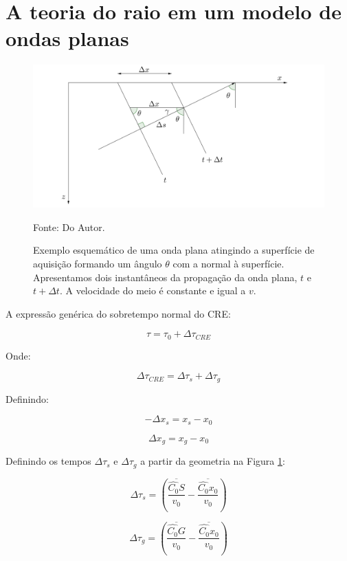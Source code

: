 \documentclass[a4paper, 12pt]{article}
\begin{document}
\section{A teoria do raio em um modelo de ondas planas}

\begin{figure}[H]
\caption{Exemplo esquemático de uma onda plana atingindo a superfície de aquisição formando um ângulo $\theta$
com a normal à superfície. Apresentamos dois instantâneos da propagação da onda plana, $t$ e $t + \Delta t$.
A velocidade do meio é constante e igual a $v$.}
\begin{center}
\includegraphics[scale=0.7]{images/raio_ondas_planas.png}
\vspace{-0.3cm}
\end{center}
\begin{center}
 Fonte: Do Autor.
\end{center}
\label{fig:1.1}
\end{figure}

A expressão genérica do sobretempo normal do CRE:

\begin{equation}
\label{eq:1.1}
\tau = \tau_0 + \Delta \tau_{CRE}
\end{equation}

Onde:

\begin{equation}
\label{eq:1.2}
\Delta \tau_{CRE} = \Delta \tau_s + \Delta \tau_g
\end{equation}

Definindo:

\begin{equation}
\label{eq:1.3}
-\Delta x_s = x_s - x_0
\end{equation}

\begin{equation}
\label{eq:1.4}
\Delta x_g = x_g - x_0
\end{equation}

Definindo os tempos $\Delta \tau_s$ e $\Delta \tau_g$ a partir da geometria na Figura \ref{fig:1.1}:

\begin{equation}
\label{eq:1.5}
\Delta \tau_s = \left( \frac{\overline{\hat{C_0}S}}{v_0} - \frac{\overline{\hat{C_0}x_0}}{v_0} \right)
\end{equation}

\begin{equation}
\label{eq:1.6}
\Delta \tau_g = \left( \frac{\overline{\hat{C_0}G}}{v_0} - \frac{\overline{\hat{C_0}x_0}}{v_0} \right)
\end{equation}
\end{document}
